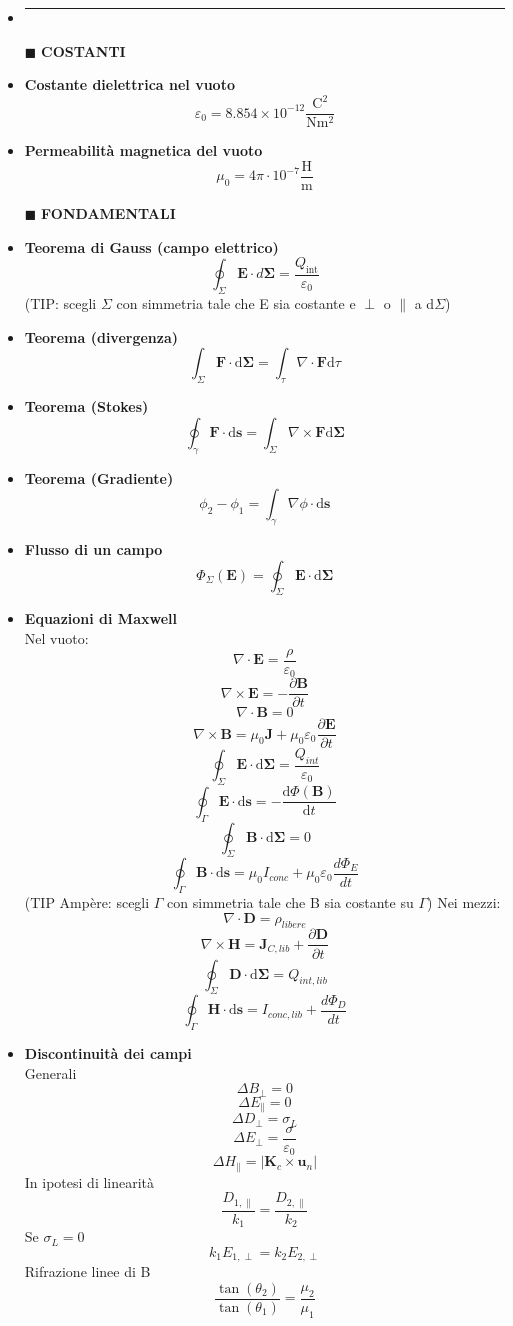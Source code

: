 \documentclass{book}
\newcommand{\g}{\textbf}
\newcommand{\h}{\mathbf}
\newcommand{\e}{\begin{equation}}
\newcommand{\ex}{\end{equation} }
\renewcommand{\it}{\item[$\cdot$]}
\newcommand{\sep}{\item[]\rule{\linewidth}{0.4pt}}
\begin{document}
 
\begin{multicols}{4}
\begin{itemize}
\sep
\item [$\blacksquare$] \g{COSTANTI}
    \it \g{Costante dielettrica nel vuoto}
        \e{\varepsilon_0 = 8.854 \times 10^{-12} \frac{\text{C}^2}{\text{N} \text{m}^2}} \ex
    \it \g{Permeabilità magnetica del vuoto}
        \e{{\mu }_{0}=4\pi \cdot 10^{-7} \frac{\text{H}}{\text{m}}} \ex
\item [$\blacksquare$] \g{FONDAMENTALI}
    \it \g{Teorema di Gauss (campo elettrico)}
        \e{\oint_{\Sigma} \h{E} \cdot d\h{\Sigma} = \frac{Q_{\text{int}}}{\varepsilon_0}} \ex
        (TIP: scegli $\Sigma$ con simmetria tale che E sia costante e $\perp$ o $\parallel$ a d$\Sigma$)
    \it \g{Teorema (divergenza)}
        \e{\int_\Sigma \h{F} \cdot \mathrm{d} \h{\Sigma}= \int_\tau \nabla \cdot \h{F} \mathrm{d}\tau} \ex
    \it \g{Teorema (Stokes)}
        \e{\oint_\gamma\h{F}\cdot \mathrm{d}\h{s}=\int_\Sigma \nabla \times \h{F} \mathrm{d}\h{\Sigma}} \ex
    \it \g{Teorema (Gradiente)}
        \e{\phi_2-\phi_1=\int_\gamma\nabla\phi\cdot \mathrm{d}\h{s} }\ex
    \it \g{Flusso di un campo}
        \e{ \Phi_\Sigma(\h{E})=\oint_\Sigma \h{E}\cdot \mathrm{d}\h{\Sigma}   
        } \ex
    \it \g{Equazioni di Maxwell} \\
        Nel vuoto:
        \e{\nabla\cdot\h{E}=\frac{\rho}{\varepsilon_0}}\ex
        \e{\nabla\times\h{E}=-\frac{\partial \h{B}}{\partial t}} \ex
        \e{\nabla\cdot\h{B}=0}\ex
        \e{\nabla\times\h{B}=\mu_0\h{J}+\mu_0\varepsilon_0\frac{\partial \h{E}}{\partial t}} \ex
        \e{\oint_\Sigma\h{E}\cdot \mathrm{d}\h{\Sigma}=\frac{Q_{int}}{\varepsilon_0}} \ex
        \e{\oint_\Gamma\h{E}\cdot \mathrm{d}\h{s}=-\frac{\mathrm{d} \Phi(\h{B})}{\mathrm{d}t}} \ex
        \e{\oint_\Sigma\h{B}\cdot \mathrm{d}\h{\Sigma}=0} \ex
        \e{\oint_\Gamma\h{B}\cdot \mathrm{d}\h{s}=\mu_0 I_{conc} +\mu_0\varepsilon_0\frac{d \Phi_E}{d t}} \ex
        (TIP Amp\`ere: scegli $\Gamma$ con simmetria tale che B sia costante su $\Gamma$)
        Nei mezzi:
        \e{\nabla\cdot\h{D}=\rho_{libere}}\ex
        \e{\nabla\times\h{H}=\h{J}_{C,lib}+\frac{\partial\h{D}}{\partial t}} \ex
        \e{\oint_\Sigma\h{D}\cdot \mathrm{d}\h{\Sigma}=Q_{int,lib}} \ex
        \e{\oint_\Gamma\h{H}\cdot \mathrm{d}\h{s}=I_{conc,lib} + \frac{d \Phi_D}{d t}} \ex
    \it \g{Discontinuità dei campi} \\
        Generali
        \e{\Delta B_\perp=0}\ex
        \e{\Delta E_\parallel=0}\ex
        \e{\Delta D_\perp=\sigma_L} \ex
        \e{\Delta E_\perp=\frac{\sigma}{\varepsilon_0}}\ex
        \e{\Delta H_\parallel=|\h{K}_c\times\h{u}_n|}\ex
        In ipotesi di linearità
        \e{\frac{D_{1,\parallel}}{k_1}=\frac{D_{2,\parallel}}{k_2}}\ex
        Se $\sigma_L=0$
        \e{k_1E_{1,\perp}=k_2E_{2,\perp}}\ex
        Rifrazione linee di B
        \e{\frac{\tan(\theta_2)}{\tan(\theta_1)}=\frac{\mu_2}{\mu_1}} \ex
        

\end{itemize}
\end{multicols}
\end{document}
